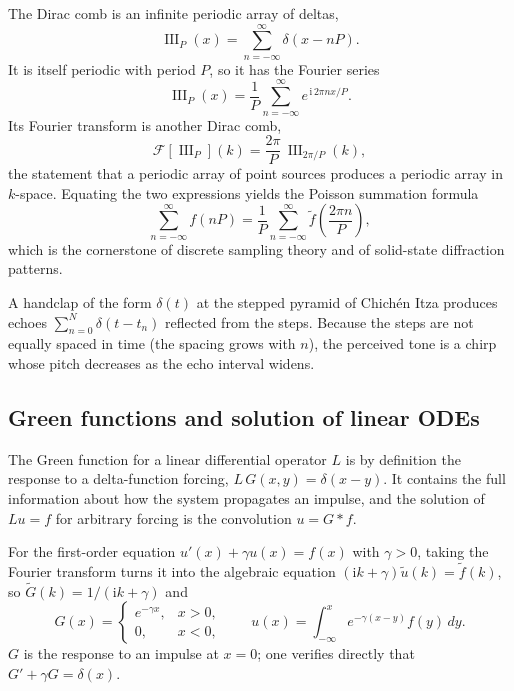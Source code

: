 The Dirac comb is an infinite periodic array of deltas,
\begin{equation}
\mathop{\mathrm{III}}\nolimits_P(x)=\sum_{n=-\infty}^{\infty}\delta(x-nP).
\end{equation}
It is itself periodic with period $P$, so it has the Fourier series
\begin{equation}
\mathop{\mathrm{III}}\nolimits_P(x)=\frac{1}{P}\sum_{n=-\infty}^{\infty}e^{\,\mathrm{i}\,2\pi nx/P}.
\end{equation}
Its Fourier transform is another Dirac comb,
\begin{equation}
\mathcal{F}\!\left[\mathop{\mathrm{III}}\nolimits_P\right](k)=\frac{2\pi}{P}\,\mathop{\mathrm{III}}\nolimits_{2\pi/P}(k),
\end{equation}
the statement that a periodic array of point sources produces a periodic array in $k$-space. Equating the two expressions yields the Poisson summation formula
\begin{equation}
\sum_{n=-\infty}^{\infty}f(nP)=\frac{1}{P}\sum_{n=-\infty}^{\infty}\widetilde f\!\left(\frac{2\pi n}{P}\right),
\end{equation}
which is the cornerstone of discrete sampling theory and of solid-state diffraction patterns.

\begin{example}
A handclap of the form $\delta(t)$ at the stepped pyramid of Chich\'en Itza produces echoes $\sum_{n=0}^N\delta(t-t_n)$ reflected from the steps. Because the steps are not equally spaced in time (the spacing grows with $n$), the perceived tone is a chirp whose pitch decreases as the echo interval widens.
\end{example}

\subsection{Green functions and solution of linear ODEs}

The Green function for a linear differential operator $L$ is by definition the response to a delta-function forcing, $L\,G(x,y)=\delta(x-y)$. It contains the full information about how the system propagates an impulse, and the solution of $L u=f$ for arbitrary forcing is the convolution $u=G*f$.

For the first-order equation $u'(x)+\gamma u(x)=f(x)$ with $\gamma>0$, taking the Fourier transform turns it into the algebraic equation $(\mathrm{i}k+\gamma)\widetilde u(k)=\widetilde f(k)$, so $\widetilde G(k)=1/(\mathrm{i}k+\gamma)$ and
\begin{equation}
G(x)=
\begin{cases}
e^{-\gamma x}, & x>0,\\
0, & x<0,
\end{cases}
\qquad
u(x)=\int_{-\infty}^{x}e^{-\gamma(x-y)}f(y)\,dy.
\end{equation}
$G$ is the response to an impulse at $x=0$; one verifies directly that $G'+\gamma G=\delta(x)$.


